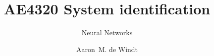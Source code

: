 \documentclass[whitelogo]{tudelft-report}
\begin{document}
\frontmatter


\title[tudelft-white]{AE4320 System identification}
\subtitle[tudelft-black]{Neural Networks}
\author[tudelft-white]{Aaron\ M. de Windt}
\makecover[split]






\tableofcontents

\mainmatter



\appendix

%


\end{document}
